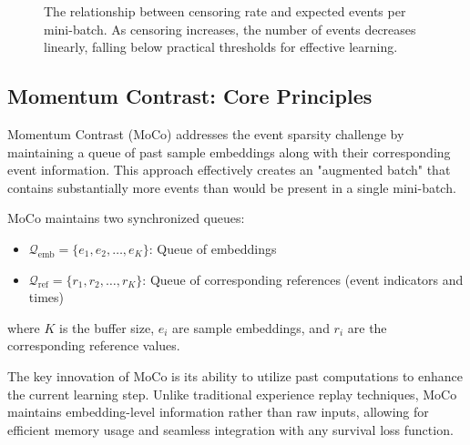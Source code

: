 \begin{figure}[ht]
  \caption{The relationship between censoring rate and expected events per mini-batch. As censoring increases, the number of events decreases linearly, falling below practical thresholds for effective learning.}
  \label{fig:event-sparsity}
\end{figure}

\subsection{Momentum Contrast: Core Principles}

Momentum Contrast (MoCo) addresses the event sparsity challenge by maintaining a queue of past sample embeddings along with their corresponding event information. This approach effectively creates an "augmented batch" that contains substantially more events than would be present in a single mini-batch.

\begin{definitionbox}[title=Momentum Contrast Buffer]
  MoCo maintains two synchronized queues:
  \begin{itemize}
  \item $\mathcal{Q}_{\text{emb}} = \{e_1, e_2, \ldots, e_K\}$: Queue of embeddings
  \item $\mathcal{Q}_{\text{ref}} = \{r_1, r_2, \ldots, r_K\}$: Queue of corresponding references (event indicators and times)
  \end{itemize}

  where $K$ is the buffer size, $e_i$ are sample embeddings, and $r_i$ are the corresponding reference values.
\end{definitionbox}

The key innovation of MoCo is its ability to utilize past computations to enhance the current learning step. Unlike traditional experience replay techniques, MoCo maintains embedding-level information rather than raw inputs, allowing for efficient memory usage and seamless integration with any survival loss function.

